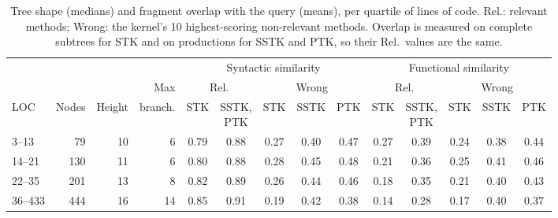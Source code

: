 \begin{table}[!htbp]
\centering
\caption{Tree shape (medians) and fragment overlap with the query (means), per quartile of lines of code. Rel.: relevant methods; Wrong: the kernel's 10 highest-scoring non-relevant methods. Overlap is measured on complete subtrees for STK and on productions for SSTK and PTK, so their Rel.\ values are the same.}
\label{tab:diag}
\footnotesize
\setlength{\tabcolsep}{4pt}
\begin{tabular}{l|rrr|ccccc|ccccc}
\toprule
 & & & & \multicolumn{5}{c}{Syntactic similarity} & \multicolumn{5}{c}{Functional similarity} \\
\cmidrule(lr){5-9}\cmidrule(lr){10-14}
 & & & Max & \multicolumn{2}{c}{Rel.} & \multicolumn{3}{c}{Wrong} & \multicolumn{2}{c}{Rel.} & \multicolumn{3}{c}{Wrong} \\
\cmidrule(lr){5-6}\cmidrule(lr){7-9}\cmidrule(lr){10-11}\cmidrule(lr){12-14}
LOC & Nodes & Height & branch. & STK & \shortstack{SSTK,\\PTK} & STK & SSTK & PTK & STK & \shortstack{SSTK,\\PTK} & STK & SSTK & PTK \\
\midrule
3--13 & 79 & 10 & 6 & 0.79 & 0.88 & 0.27 & 0.40 & 0.47 & 0.27 & 0.39 & 0.24 & 0.38 & 0.44 \\
14--21 & 130 & 11 & 6 & 0.80 & 0.88 & 0.28 & 0.45 & 0.48 & 0.21 & 0.36 & 0.25 & 0.41 & 0.46 \\
22--35 & 201 & 13 & 8 & 0.82 & 0.89 & 0.26 & 0.44 & 0.46 & 0.18 & 0.35 & 0.21 & 0.40 & 0.43 \\
36--433 & 444 & 16 & 14 & 0.85 & 0.91 & 0.19 & 0.42 & 0.38 & 0.14 & 0.28 & 0.17 & 0.40 & 0.37 \\
\bottomrule
\end{tabular}
\end{table}
